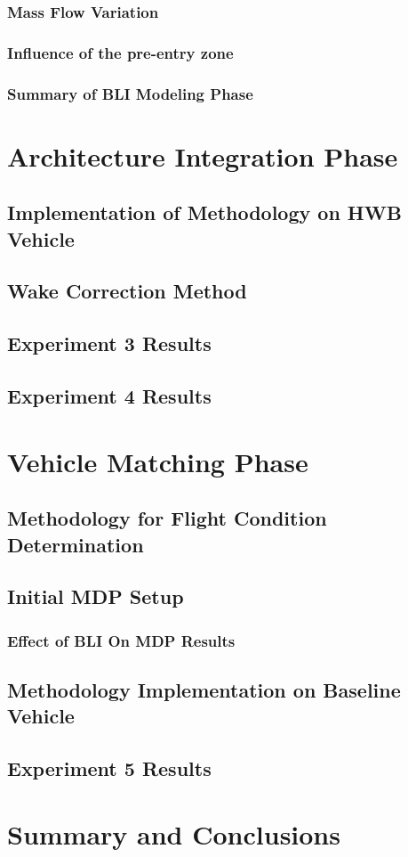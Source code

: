 \documentclass[12pt]{gatech-thesis}
\begin{document}
\subsection{Mass Flow Variation}

\subsection{Influence of the pre-entry zone}

\subsection{Summary of BLI Modeling Phase}

\chapter{Architecture Integration Phase}

\section{Implementation of Methodology on HWB Vehicle}
\section{Wake Correction Method}
\section{Experiment 3 Results}
\section{Experiment 4 Results}

\chapter{Vehicle Matching Phase}
\section{Methodology for Flight Condition Determination}
\section{Initial MDP Setup}
\subsection{Effect of BLI On MDP Results}
\section{Methodology Implementation on Baseline Vehicle}
\section{Experiment 5 Results}

\chapter{Summary and Conclusions}


\nocite{*}
 

\begin{postliminary}


\end{postliminary}
\end{document}
